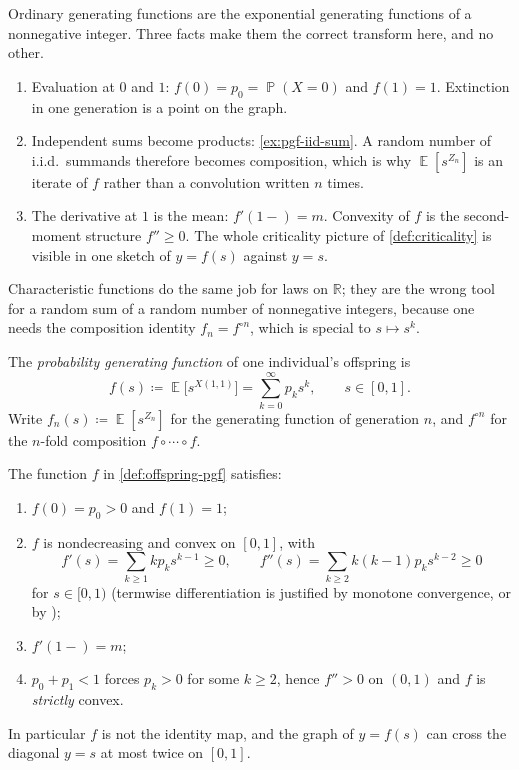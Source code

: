 \documentclass[11pt,a4paper]{article}
\DeclareMathOperator{\E}{\mathbb{E}}
\DeclareMathOperator{\Pbb}{\mathbb{P}}
\begin{document}
\begin{remark}
\label{rem:why-pgf}
Ordinary generating functions are the exponential generating functions of a nonnegative integer. Three facts make them the correct transform here, and no other.
\begin{enumerate}[label=\textup{(\roman*)}]
    \item
    Evaluation at \(0\) and \(1\): \(f(0)=p_0=\Pbb(X=0)\) and \(f(1)=1\). Extinction in one generation is a point on the graph.
    \item
    Independent sums become products: \cref{ex:pgf-iid-sum}. A random number of i.i.d.\ summands therefore becomes composition, which is why \(\E[s^{Z_n}]\) is an iterate of \(f\) rather than a convolution written \(n\) times.
    \item
    The derivative at \(1\) is the mean: \(f'(1-)=m\). Convexity of \(f\) is the second-moment structure \(f''\ge 0\). The whole criticality picture of \cref{def:criticality} is visible in one sketch of \(y=f(s)\) against \(y=s\).
\end{enumerate}
Characteristic functions do the same job for laws on \(\mathbb{R}\); they are the wrong tool for a random sum of a random number of nonnegative integers, because one needs the composition identity \(f_n=f^{\circ n}\), which is special to \(s\mapsto s^k\).
\end{remark}

\begin{definition}
\label{def:offspring-pgf}
The \emph{probability generating function} of one individual's offspring is
\[
f(s)
\coloneqq
\E\bigl[s^{X(1,1)}\bigr]
=
\sum_{k=0}^{\infty} p_k s^k,
\qquad
s\in[0,1].
\]
Write \(f_n(s)\coloneqq\E[s^{Z_n}]\) for the generating function of generation \(n\), and \(f^{\circ n}\) for the \(n\)-fold composition \(f\circ\cdots\circ f\).
\end{definition}

\begin{proposition}
\label{prop:pgf-shape}
The function \(f\) in \cref{def:offspring-pgf} satisfies:
\begin{enumerate}[label=\textup{(\roman*)}]
    \item
    \(f(0)=p_0>0\) and \(f(1)=1\);
    \item
    \(f\) is nondecreasing and convex on \([0,1]\), with
    \[
    f'(s)
    =
    \sum_{k\ge 1} k p_k s^{k-1}
    \ge 0,
    \qquad
    f''(s)
    =
    \sum_{k\ge 2} k(k-1)p_k s^{k-2}
    \ge 0
    \]
    for \(s\in[0,1)\) (termwise differentiation is justified by monotone convergence, or by \citep[Theorem~A.5.2]{durrett2010});
    \item
    \(f'(1-)=m\);
    \item
    \(p_0+p_1<1\) forces \(p_k>0\) for some \(k\ge 2\), hence \(f''>0\) on \((0,1)\) and \(f\) is \emph{strictly} convex.
\end{enumerate}
In particular \(f\) is not the identity map, and the graph of \(y=f(s)\) can cross the diagonal \(y=s\) at most twice on \([0,1]\).
\end{proposition}
\end{document}
